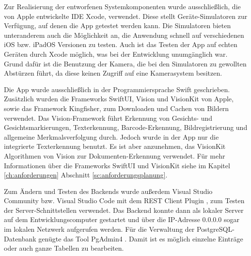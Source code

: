 \documentclass[nomenclature, oneside, 150]{HSMW-Thesis}
\begin{document}
		Zur Realisierung der entworfenen Systemkomponenten wurde ausschließlich, die von Apple entwickelte IDE Xcode, verwendet. Diese stellt Geräte-Simulatoren zur Verfügung, auf denen die App getestet werden kann. Die Simulatoren bieten unteranderem auch die Möglichkeit an, die Anwendung schnell auf verschiedenen iOS bzw. iPadOS Versionen zu testen. Auch ist das Testen der App auf echten Geräten durch Xcode möglich, was bei der Entwicklung unumgänglich war. Grund dafür ist die Benutzung der Kamera, die bei den Simulatoren zu gewollten Abstürzen führt, da diese keinen Zugriff auf eine Kamerasystem besitzen.
		
		Die App wurde ausschließlich in der Programmiersprache Swift geschrieben. Zusätzlich wurden die Frameworks SwiftUI, Vision und VisionKit von Apple, sowie das Framework Kingfisher, zum Downloaden und Cachen von Bildern verwendet. Das Vision-Framework führt Erkennung von Gesichts- und Gesichtsmarkierungen, Texterkennung, Barcode-Erkennung, Bildregistrierung und allgemeine Merkmalsverfolgung durch. Jedoch wurde in der App nur die integrierte Texterkennung benutzt. Es ist aber anzunehmen, das VisionKit Algorithmen von Vision zur Dokumenten-Erkennung verwendet. Für mehr Informationen über die Frameworks SwiftUI und VisionKit siehe im Kapitel \ref{ch:anforderungen} Abschnitt \ref{sc:anforderungsplanung}.
		
		
		Zum Ändern und Testen des Backends wurde außerdem Visual Studio Community bzw. Visual Studio Code mit dem REST Client Plugin , zum Testen der Server-Schnittstellen verwendet. Das Backend konnte dann als lokaler Server auf dem Entwicklungscomputer gestartet und über die IP-Adresse 0.0.0.0 sogar im lokalen Netzwerk aufgerufen werden. Für die Verwaltung der PostgreSQL-Datenbank genügte das Tool PgAdmin4 . Damit ist es möglich einzelne Einträge oder auch ganze Tabellen zu bearbeiten.
		
\end{document}
